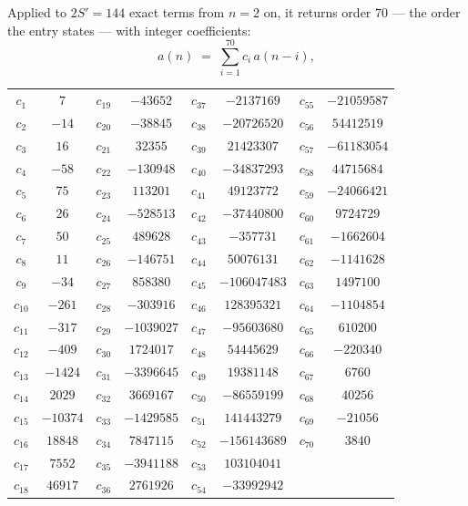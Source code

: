 \documentclass[11pt,a4paper]{article}
\theoremstyle{plain}
\theoremstyle{definition}
\begin{document}
Applied to $2S'=144$ exact terms from $n=2$ on, it returns order $70$ --- the
order the entry states --- with integer coefficients:
\[
a(n)\;=\;\sum_{i=1}^{70}c_i\,a(n-i),
\]
\begin{center}\small
\begin{tabular}{cccccccc}
$c_{1}$ & $7$ & $c_{19}$ & $-43652$ & $c_{37}$ & $-2137169$ & $c_{55}$ & $-21059587$ \\
$c_{2}$ & $-14$ & $c_{20}$ & $-38845$ & $c_{38}$ & $-20726520$ & $c_{56}$ & $54412519$ \\
$c_{3}$ & $16$ & $c_{21}$ & $32355$ & $c_{39}$ & $21423307$ & $c_{57}$ & $-61183054$ \\
$c_{4}$ & $-58$ & $c_{22}$ & $-130948$ & $c_{40}$ & $-34837293$ & $c_{58}$ & $44715684$ \\
$c_{5}$ & $75$ & $c_{23}$ & $113201$ & $c_{41}$ & $49123772$ & $c_{59}$ & $-24066421$ \\
$c_{6}$ & $26$ & $c_{24}$ & $-528513$ & $c_{42}$ & $-37440800$ & $c_{60}$ & $9724729$ \\
$c_{7}$ & $50$ & $c_{25}$ & $489628$ & $c_{43}$ & $-357731$ & $c_{61}$ & $-1662604$ \\
$c_{8}$ & $11$ & $c_{26}$ & $-146751$ & $c_{44}$ & $50076131$ & $c_{62}$ & $-1141628$ \\
$c_{9}$ & $-34$ & $c_{27}$ & $858380$ & $c_{45}$ & $-106047483$ & $c_{63}$ & $1497100$ \\
$c_{10}$ & $-261$ & $c_{28}$ & $-303916$ & $c_{46}$ & $128395321$ & $c_{64}$ & $-1104854$ \\
$c_{11}$ & $-317$ & $c_{29}$ & $-1039027$ & $c_{47}$ & $-95603680$ & $c_{65}$ & $610200$ \\
$c_{12}$ & $-409$ & $c_{30}$ & $1724017$ & $c_{48}$ & $54445629$ & $c_{66}$ & $-220340$ \\
$c_{13}$ & $-1424$ & $c_{31}$ & $-3396645$ & $c_{49}$ & $19381148$ & $c_{67}$ & $6760$ \\
$c_{14}$ & $2029$ & $c_{32}$ & $3669167$ & $c_{50}$ & $-86559199$ & $c_{68}$ & $40256$ \\
$c_{15}$ & $-10374$ & $c_{33}$ & $-1429585$ & $c_{51}$ & $141443279$ & $c_{69}$ & $-21056$ \\
$c_{16}$ & $18848$ & $c_{34}$ & $7847115$ & $c_{52}$ & $-156143689$ & $c_{70}$ & $3840$ \\
$c_{17}$ & $7552$ & $c_{35}$ & $-3941188$ & $c_{53}$ & $103104041$ &  &  \\
$c_{18}$ & $46917$ & $c_{36}$ & $2761926$ & $c_{54}$ & $-33992942$ &  &  \\
\end{tabular}
\end{center}
\end{document}
